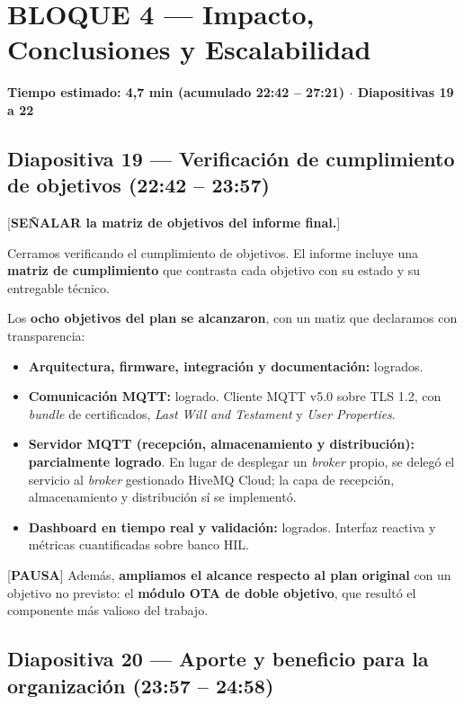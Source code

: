 \documentclass[11pt, a4paper]{article}
\begin{document}
\section*{BLOQUE 4 — Impacto, Conclusiones y Escalabilidad}
\textbf{Tiempo estimado: 4,7 min (acumulado 22:42 – 27:21) $\cdot$ Diapositivas 19 a 22}

\subsection*{Diapositiva 19 — Verificación de cumplimiento de objetivos (22:42 – 23:57)}

[\textbf{SEÑALAR la matriz de objetivos del informe final.}]

Cerramos verificando el cumplimiento de objetivos. El informe incluye una \textbf{matriz de cumplimiento} que contrasta cada objetivo con su estado y su entregable técnico.

Los \textbf{ocho objetivos del plan se alcanzaron}, con un matiz que declaramos con transparencia:

\begin{itemize}[label=-]
    \item \textbf{Arquitectura, firmware, integración y documentación:} logrados.
    \item \textbf{Comunicación MQTT:} logrado. Cliente MQTT v5.0 sobre TLS 1.2, con \textit{bundle} de certificados, \textit{Last Will and Testament} y \textit{User Properties}.
    \item \textbf{Servidor MQTT (recepción, almacenamiento y distribución):} \textbf{parcialmente logrado}. En lugar de desplegar un \textit{broker} propio, se delegó el servicio al \textit{broker} gestionado HiveMQ Cloud; la capa de recepción, almacenamiento y distribución sí se implementó.
    \item \textbf{Dashboard en tiempo real y validación:} logrados. Interfaz reactiva y métricas cuantificadas sobre banco HIL.
\end{itemize}

[\textbf{PAUSA}] Además, \textbf{ampliamos el alcance respecto al plan original} con un objetivo no previsto: el \textbf{módulo OTA de doble objetivo}, que resultó el componente más valioso del trabajo.

\subsection*{Diapositiva 20 — Aporte y beneficio para la organización (23:57 – 24:58)}
\end{document}
